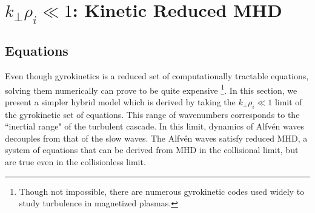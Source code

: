 %
%
%

    \section{$k_\perp \rho_i \ll 1$: Kinetic Reduced MHD}
    \label{eqs:sec:krmhd}
    \subsection{Equations}

    Even though gyrokinetics is a reduced set of computationally tractable equations,
    solving them
    numerically can prove to be quite expensive \footnote{Though not impossible, there
    are numerous gyrokinetic codes used widely to study turbulence in magnetized plasmas.}. In this section, we present a simpler
    hybrid model which is derived by taking the $k_\perp \rho_i \ll 1$ limit of the
    gyrokinetic set of equations. This range of wavenumbers corresponds to the ``inertial range"
    of the turbulent cascade. In this limit, dynamics of Alfv\'{e}n waves decouples from
    that of the slow waves.  The Alfv\'{e}n waves satisfy reduced MHD, a system of
    equations that can be derived from MHD in the collisional limit, but are true even in the
    collisionless limit.
    
